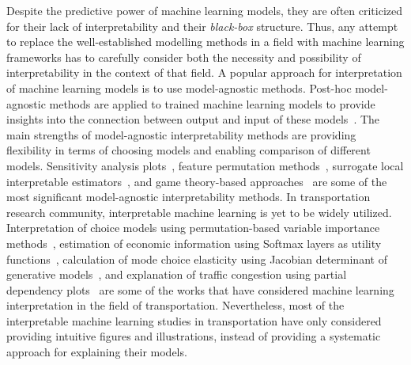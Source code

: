 Despite the predictive power of machine learning models, they are often criticized for their lack of interpretability and their \textit{black-box} structure. Thus, any attempt to replace the well-established modelling methods in a field with machine learning frameworks has to carefully consider both the necessity and possibility of interpretability in the context of that field. A popular approach for interpretation of machine learning models is to use model-agnostic methods. Post-hoc model-agnostic methods are applied to trained machine learning models to provide insights into the connection between output and input of these models~\cite{ribeiro2016model}. The main strengths of model-agnostic interpretability methods are providing flexibility in terms of choosing models and enabling comparison of different models. Sensitivity analysis plots~\cite{goldstein2015peeking}, feature permutation methods~\cite{fisher2018all}, surrogate local interpretable estimators~\cite{ribeiro2016should}, and game theory-based approaches~\cite{vstrumbelj2014explaining,lundberg2017unified} are some of the most significant model-agnostic interpretability methods. In transportation research community, interpretable machine learning is yet to be widely utilized. Interpretation of choice models using permutation-based variable importance methods~\cite{hagenauer2017comparative}, estimation of economic information using Softmax layers as utility functions~\cite{wang2018deep}, calculation of mode choice elasticity using Jacobian determinant of generative models~\cite{wong2020bi}, and explanation of traffic congestion using partial dependency plots~\cite{das2019interpretable} are some of the works that have considered machine learning interpretation in the field of transportation. Nevertheless, most of the interpretable machine learning studies in transportation have only considered providing intuitive figures and illustrations, instead of providing a systematic approach for explaining their models.  

